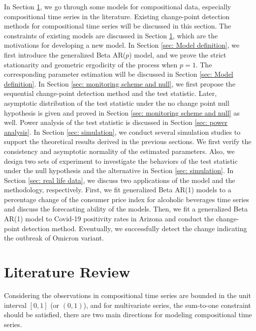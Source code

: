 \documentclass{article}
\theoremstyle{definition}
\begin{document}
In Section \ref{sec: Literature Review}, we go through some models for compositional data, especially compositional time series in the literature. Existing change-point detection methods for compositional time series will be discussed in this section. The constraints of existing models are discussed in Section \ref{sec: Literature Review}, which are the motivations for developing a new model. In Section \ref{sec: Model definition}, we first introduce the generalized Beta AR($p$) model, and we prove the strict stationarity and geometric ergodicity of the process when $p=1$. The corresponding parameter estimation will be discussed in Section \ref{sec: Model definition}. In Section \ref{sec: monitoring scheme and null}, we first propose the sequential change-point detection method and the test statistic. Later, asymptotic distribution of the test statistic under the no change point null hypothesis is given and proved in Section \ref{sec: monitoring scheme and null} as well. Power analysis of the test statistic is discussed in Section \ref{sec: power analysis}. In Section \ref{sec: simulation}, we conduct several simulation studies to support the theoretical results derived in the previous sections. We first verify the consistency and asymptotic normality of the estimated parameters. Also, we design two sets of experiment to investigate the behaviors of the test statistic under the null hypothesis and the alternative in Section \ref{sec: simulation}. In Section \ref{sec: real life data}, we discuss two applications of the model and the methodology, respectively. First, we fit generalized Beta AR(1) models to a percentage change of the consumer price index for alcoholic beverages time series and discuss the forecasting ability of the models. Then, we fit a generalized Beta AR(1) model to Covid-19 positivity rates in Arizona and conduct the change-point detection method. Eventually, we successfully detect the change indicating the outbreak of Omicron variant. 

\section{Literature Review}
\label{sec: Literature Review}
Considering the observations in compositional time series are bounded in the unit interval $[0,1]$ (or $(0,1)$), and for multivariate series, the sum-to-one constraint should be satisfied, there are two main directions for modeling compositional time series. 
\end{document}

